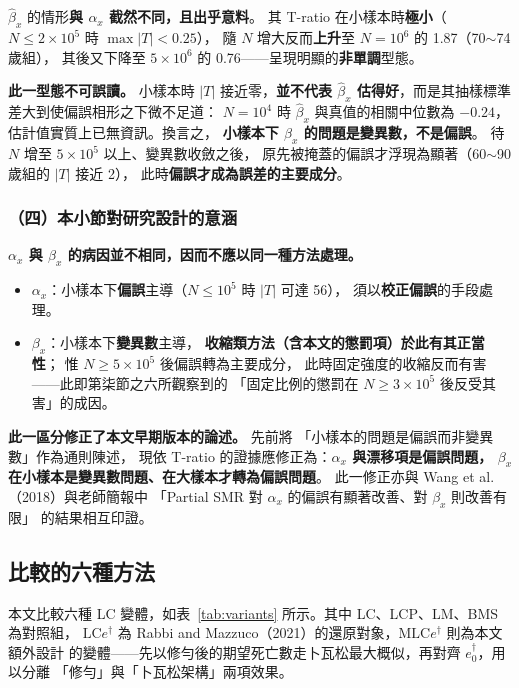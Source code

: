 \documentclass[UTF8, fontset=macnew, a4paper, 12pt]{ctexart}
\newcommand{\edag}{e_0^{\dagger}}
\newcommand{\LCe}{\mathrm{LC}e^{\dagger}}
\begin{document}
$\hat\beta_x$ 的情形\textbf{與 $\alpha_x$ 截然不同，且出乎意料}。
其 T-ratio 在小樣本時\textbf{極小}（$N\le2\times10^5$ 時 $\max|T|<0.25$），
隨 $N$ 增大反而\textbf{上升}至 $N=10^6$ 的 1.87（70$\sim$74 歲組），
其後又下降至 $5\times10^6$ 的 0.76——呈現明顯的\textbf{非單調}型態。

\textbf{此一型態不可誤讀。} 小樣本時 $|T|$ 接近零，\textbf{並不代表
$\hat\beta_x$ 估得好}，而是其抽樣標準差大到使偏誤相形之下微不足道：
$N=10^4$ 時 $\hat\beta_x$ 與真值的相關中位數為 $-0.24$，
估計值實質上已無資訊。換言之，
\textbf{小樣本下 $\beta_x$ 的問題是變異數，不是偏誤}。
待 $N$ 增至 $5\times10^5$ 以上、變異數收斂之後，
原先被掩蓋的偏誤才浮現為顯著（60$\sim$90 歲組的 $|T|$ 接近 2），
此時\textbf{偏誤才成為誤差的主要成分}。

\subsubsection{（四）本小節對研究設計的意涵}

\textbf{$\alpha_x$ 與 $\beta_x$ 的病因並不相同，因而不應以同一種方法處理。}

\begin{itemize}
  \item $\alpha_x$：小樣本下\textbf{偏誤}主導（$N\le10^5$ 時 $|T|$ 可達 56），
        須以\textbf{校正偏誤}的手段處理。
  \item $\beta_x$：小樣本下\textbf{變異數}主導，
        \textbf{收縮類方法（含本文的懲罰項）於此有其正當性}；
        惟 $N\ge5\times10^5$ 後偏誤轉為主要成分，
        此時固定強度的收縮反而有害——此即第柒節之六所觀察到的
        「固定比例的懲罰在 $N\ge3\times10^5$ 後反受其害」的成因。
\end{itemize}

\noindent\textbf{此一區分修正了本文早期版本的論述。} 先前將
「小樣本的問題是偏誤而非變異數」作為通則陳述，
現依 T-ratio 的證據應修正為：\textbf{$\alpha_x$ 與漂移項是偏誤問題，
$\beta_x$ 在小樣本是變異數問題、在大樣本才轉為偏誤問題}。
此一修正亦與 Wang et al.（2018）與老師簡報中
「Partial SMR 對 $\alpha_x$ 的偏誤有顯著改善、對 $\beta_x$ 則改善有限」
的結果相互印證。

\subsection{比較的六種方法}

本文比較六種 LC 變體，如表~\ref{tab:variants} 所示。其中 LC、LCP、LM、BMS 為對照組，
$\LCe$ 為 Rabbi and Mazzuco（2021）的還原對象，M$\LCe$ 則為本文額外設計
的變體——先以修勻後的期望死亡數走卜瓦松最大概似，再對齊 $\edag$，用以分離
「修勻」與「卜瓦松架構」兩項效果。
\end{document}
